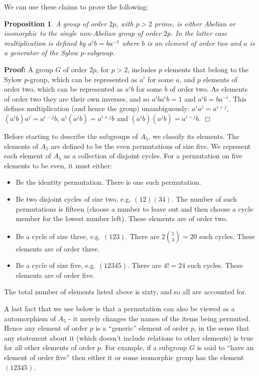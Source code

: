 \documentclass[11pt]{article} \usepackage{amssymb}
\newtheorem{proposition}[theorem]{Proposition}
\newenvironment{proof}{\noindent \textbf{Proof:}}{$\Box$}
\begin{document}
\begin{enumerate}
    We can use these claims to prove the following:
    \begin{proposition}
      \label{prop:2p_unique}
      A group of order $2p$, with $p>2$ prime, is either Abelian or isomorphic 
      to the single non-Abelian
      group of order $2p$. In the latter case multiplication is defined by
      $a^ib=ba^{-1}$ where $b$ is an element of order two and $a$ is a generator
      of the Sylow $p$-subgroup.
    \end{proposition}
    \begin{proof}
      A group $G$ of order $2p$, for $p>2$, includes $p$ elements that 
      belong to the Sylow $p$-group,
      which can be represented as $a^i$ for some $a$, and $p$ elements of order
      two, which can be represented as $a^ib$ for some $b$ of order two. As
      elements of order two they are their own inverses, and so $a^iba^ib=1$ and
      $a^ib=ba^{-i}$. This defines multiplication (and hence the group) 
      unambiguously: $a^ia^j=a^{i+j}$,
      $(a^ib)a^j=a^{i-j}b$, $a^i(a^jb)=a^{i+j}b$ and $(a^ib)(a^jb)=a^{i-j}b$.
    \end{proof}

    Before starting to describe the subgroups of $A_5$, we classify its
    elements.
    The elements of $A_5$ are defined to be the even permutations of size five.
    We represent each element of $A_5$
    as a collection of disjoint cycles. For a permutation on five elements
    to be even, it must either:
    \begin{itemize}
    \item Be the identity permutation. There is one such permutation.
    \item Be two disjoint cycles of size two, e.g. $(12)(34)$. The number of 
      such permutations
      is fifteen (choose a number to leave out and then choose a cycle member
      for the lowest number left). These elements are of order two.
    \item Be a cycle of size three, e.g. $(123)$. There are 
      $2{5 \choose 3}=20$ such cycles. These elements are of order three.
    \item Be a cycle of size five, e.g. $(12345)$. There are $4!=24$ such 
      cycles. These elements are of order five.
    \end{itemize}
    The total number of elements listed above is sixty, and so all are accounted
    for.

    A last fact that we use below is that a permutation can also be viewed
    as a automorphism of $A_5$ - it merely changes the names of the items 
    being permuted. Hence any element of order $p$
    is a ``generic'' element of order $p$, in the sense that any statement
    about it (which doesn't include relations to other elements) is true
    for all other elements of order $p$. For example, if a subgroup $G$ is said
    to ``have an element of order five'' then either it or some isomorphic
    group has the element $(12345)$.


\end{enumerate}
\end{document}
